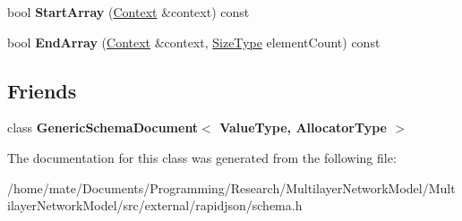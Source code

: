 \begin{DoxyCompactItemize}
\item 
bool {\bfseries Start\+Array} (\hyperlink{structinternal_1_1SchemaValidationContext}{Context} \&context) const \hypertarget{classinternal_1_1Schema_a6340166b92577ce0ef9b7735f66937ec}{}\label{classinternal_1_1Schema_a6340166b92577ce0ef9b7735f66937ec}

\item 
bool {\bfseries End\+Array} (\hyperlink{structinternal_1_1SchemaValidationContext}{Context} \&context, \hyperlink{rapidjson_8h_a5ed6e6e67250fadbd041127e6386dcb5}{Size\+Type} element\+Count) const \hypertarget{classinternal_1_1Schema_a58101f966bd7e51086d456b3d84653eb}{}\label{classinternal_1_1Schema_a58101f966bd7e51086d456b3d84653eb}

\end{DoxyCompactItemize}
\subsection*{Friends}
\begin{DoxyCompactItemize}
\item 
class {\bfseries Generic\+Schema\+Document$<$ Value\+Type, Allocator\+Type $>$}\hypertarget{classinternal_1_1Schema_a04f1d1acd0a5a7fda069c115970d52b3}{}\label{classinternal_1_1Schema_a04f1d1acd0a5a7fda069c115970d52b3}

\end{DoxyCompactItemize}


The documentation for this class was generated from the following file\+:\begin{DoxyCompactItemize}
\item 
/home/mate/\+Documents/\+Programming/\+Research/\+Multilayer\+Network\+Model/\+Multilayer\+Network\+Model/src/external/rapidjson/schema.\+h\end{DoxyCompactItemize}
